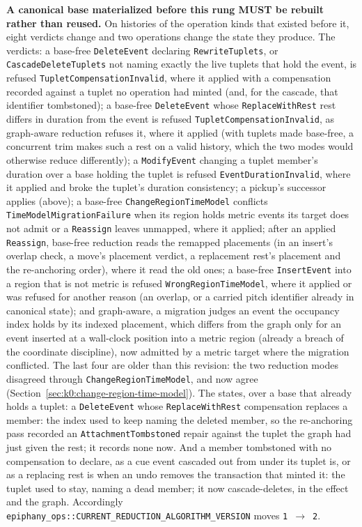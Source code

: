 \documentclass[11pt,letterpaper]{report}
\newcommand{\MUST}{\textbf{MUST}}
\begin{document}
\textbf{A canonical base materialized before this rung \MUST{} be rebuilt
rather than reused.} On histories of the operation kinds that existed before
it, eight verdicts change and two operations change the state they produce.
The verdicts: a base-free \texttt{DeleteEvent} declaring
\texttt{RewriteTuplets}, or \texttt{CascadeDeleteTuplets} not naming exactly
the live tuplets that hold the event, is refused
\texttt{TupletCompensationInvalid}, where it applied with a compensation
recorded against a tuplet no operation had minted (and, for the cascade, that
identifier tombstoned); a base-free \texttt{DeleteEvent} whose
\texttt{ReplaceWithRest} rest differs in duration from the event is refused
\texttt{TupletCompensationInvalid}, as graph-aware reduction refuses it, where
it applied (with tuplets made base-free, a concurrent trim makes such a rest
on a valid history, which the two modes would otherwise reduce differently);
a \texttt{ModifyEvent} changing a tuplet member's
duration over a base holding the tuplet is refused
\texttt{EventDurationInvalid}, where it applied and broke the tuplet's
duration consistency; a pickup's successor applies (above); a base-free
\texttt{ChangeRegionTimeModel} conflicts \texttt{TimeModelMigrationFailure}
when its region holds metric events its target does not admit or a
\texttt{Reassign} leaves unmapped, where it applied; after an applied
\texttt{Reassign}, base-free reduction reads the remapped placements (in an
insert's overlap check, a move's placement verdict, a replacement rest's
placement and the re-anchoring order), where it read the old ones; a base-free
\texttt{InsertEvent} into a region that is not metric is refused
\texttt{WrongRegionTimeModel}, where it applied or was refused for another
reason (an overlap, or a carried pitch identifier already in canonical state);
and graph-aware, a migration
judges an event the occupancy index holds by its indexed placement, which
differs from the graph only for an event inserted at a wall-clock position into
a metric region (already a breach of the coordinate discipline), now admitted
by a metric target where the migration conflicted. The last four are older
than this revision: the two reduction modes disagreed through
\texttt{ChangeRegionTimeModel}, and now agree (Section~\ref{sec:k0:change-region-time-model}). The states,
over a base that already holds a tuplet: a \texttt{DeleteEvent} whose
\texttt{ReplaceWithRest} compensation replaces a member: the index used to keep
naming the deleted member, so the re-anchoring pass recorded an
\texttt{AttachmentTombstoned} repair against the tuplet the graph had just
given the rest; it records none now. And a member tombstoned with no
compensation to declare, as a cue event cascaded out from under its tuplet
is, or as a replacing rest is when an undo removes the transaction that
minted it: the tuplet used to stay, naming a dead member; it now
cascade-deletes, in the effect and the graph. Accordingly
\texttt{epiphany\_ops::CURRENT\_REDUCTION\_ALGORITHM\_VERSION} moves
\texttt{1}~$\rightarrow$~\texttt{2}.
\end{document}
